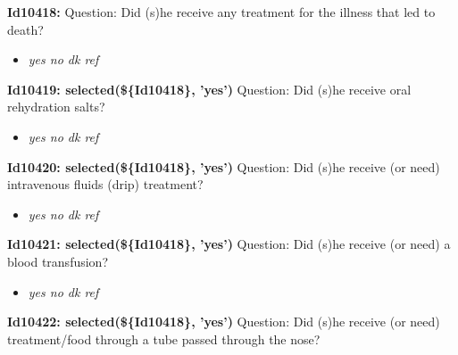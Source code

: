 \documentclass{article}%
\begin{document}
\textbf{Id10418: \newline%
}%
Question: Did (s)he receive any treatment for the illness that led to death?\newline%
%
\begin{itemize}%
\item%
\textit{yes\newline%
 no\newline%
 dk\newline%
 ref\newline%
}%
\end{itemize}%
\textbf{Id10419: selected(\$\{Id10418\}, 'yes')\newline%
}%
Question: Did (s)he receive oral rehydration salts?\newline%
%
\begin{itemize}%
\item%
\textit{yes\newline%
 no\newline%
 dk\newline%
 ref\newline%
}%
\end{itemize}%
\textbf{Id10420: selected(\$\{Id10418\}, 'yes')\newline%
}%
Question: Did (s)he receive (or need) intravenous fluids (drip) treatment?\newline%
%
\begin{itemize}%
\item%
\textit{yes\newline%
 no\newline%
 dk\newline%
 ref\newline%
}%
\end{itemize}%
\textbf{Id10421: selected(\$\{Id10418\}, 'yes')\newline%
}%
Question: Did (s)he receive (or need) a blood transfusion?\newline%
%
\begin{itemize}%
\item%
\textit{yes\newline%
 no\newline%
 dk\newline%
 ref\newline%
}%
\end{itemize}%
\textbf{Id10422: selected(\$\{Id10418\}, 'yes')\newline%
}%
Question: Did (s)he receive (or need) treatment/food through a tube passed through the nose?\newline%
\end{document}
